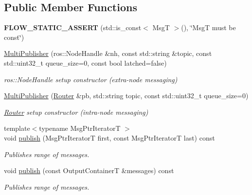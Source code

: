 \subsection*{Public Member Functions}
\begin{DoxyCompactItemize}
\item 
\mbox{\label{classflow__ros_1_1_multi_publisher_a4bf4647962d3dcd52e3c89549f9abceb}} 
{\bfseries F\+L\+O\+W\+\_\+\+S\+T\+A\+T\+I\+C\+\_\+\+A\+S\+S\+E\+RT} (std\+::is\+\_\+const$<$ MsgT $>$(), \char`\"{}MsgT must be const\char`\"{})
\item 
\hyperlink{classflow__ros_1_1_multi_publisher_a3e2ddbd297bd541cd4c7be71786a4bf0}{Multi\+Publisher} (ros\+::\+Node\+Handle \&nh, const std\+::string \&topic, const std\+::uint32\+\_\+t queue\+\_\+size=0, const bool latched=false)
\begin{DoxyCompactList}\small\item\em {\ttfamily ros\+::\+Node\+Handle} setup constructor (extra-\/node messaging) \end{DoxyCompactList}\item 
\hyperlink{classflow__ros_1_1_multi_publisher_af1d0509e1464ddb1a92e72cc90ed08cd}{Multi\+Publisher} (\hyperlink{classflow__ros_1_1_router}{Router} \&pb, std\+::string topic, const std\+::uint32\+\_\+t queue\+\_\+size=0)
\begin{DoxyCompactList}\small\item\em {\ttfamily \hyperlink{classflow__ros_1_1_router}{Router}} setup constructor (intra-\/node messaging) \end{DoxyCompactList}\item 
{\footnotesize template$<$typename Msg\+Ptr\+IteratorT $>$ }\\void \hyperlink{classflow__ros_1_1_multi_publisher_a639d20b3dd0dbc9598b8e08c0ec84255}{publish} (Msg\+Ptr\+IteratorT first, const Msg\+Ptr\+IteratorT last) const
\begin{DoxyCompactList}\small\item\em Publishes range of messages. \end{DoxyCompactList}\item 
void \hyperlink{classflow__ros_1_1_multi_publisher_adea00fbe1e1b566c9e374105325cbc6c}{publish} (const Output\+ContainerT \&messages) const
\begin{DoxyCompactList}\small\item\em Publishes range of messages. \end{DoxyCompactList}\end{DoxyCompactItemize}

